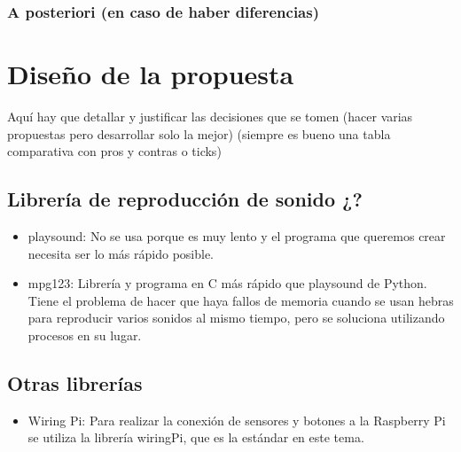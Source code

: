 \documentclass{article}
\begin{document}
 \subsubsection{A posteriori (en caso de haber diferencias)}
\section{Diseño de la propuesta}\label{sec:Diseno}

 Aquí hay que detallar y justificar las decisiones que se tomen (hacer varias propuestas pero desarrollar solo la
 mejor) (siempre es bueno una tabla comparativa con pros y contras o ticks)

 \subsection{Librería de reproducción de sonido ¿?}
 \begin{itemize}
     \item
        playsound\cite{playsound}: No se usa porque es muy lento y el programa que queremos crear necesita ser lo
        más rápido posible.
     \item
        mpg123\cite{mpg123}: Librería y programa en C más rápido que playsound de Python. Tiene el problema de
        hacer que haya fallos de memoria cuando se usan hebras para reproducir varios sonidos al mismo tiempo, pero
        se soluciona utilizando procesos en su lugar.
 \end{itemize}

 \subsection{Otras librerías}
 \begin{itemize}
     \item
        Wiring Pi\cite{wiringPi}: Para realizar la conexión de sensores y botones a la Raspberry Pi se utiliza
        la librería wiringPi, que es la estándar en este tema.
 \end{itemize}
\end{document}
